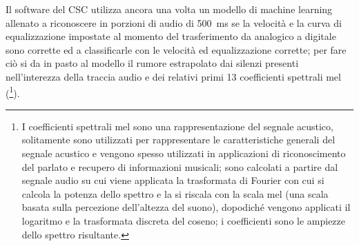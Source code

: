 Il software del CSC utilizza ancora una volta un modello di machine learning allenato a riconoscere in porzioni di audio di \qty{500}{\ms} se la velocità e la curva di equalizzazione impostate al momento del trasferimento da analogico a digitale sono corrette ed a classificarle con le velocità ed equalizzazione corrette; per fare ciò si da in pasto al modello il rumore estrapolato dai silenzi presenti nell'interezza della traccia audio e dei relativi primi 13 coefficienti spettrali mel (\footnote{I coefficienti spettrali mel sono una rappresentazione del segnale acustico, solitamente sono utilizzati per rappresentare le caratteristiche generali del segnale acustico e vengono spesso utilizzati in applicazioni di riconoscimento del parlato e recupero di informazioni musicali; sono calcolati a partire dal segnale audio su cui viene applicata la trasformata di Fourier con cui si calcola la potenza dello spettro e la si riscala con la scala mel (una scala basata sulla percezione dell'altezza del suono), dopodiché vengono applicati il logaritmo e la trasformata discreta del coseno; i coefficienti sono le ampiezze dello spettro risultante.}).